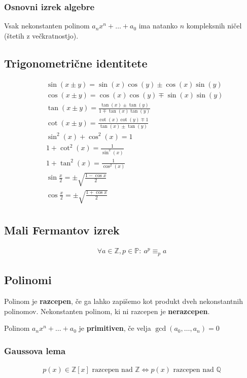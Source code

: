 	\subsubsection*{Osnovni izrek algebre}
	Vsak nekonstanten polinom $a_n x^n + \dots + a_0$ ima natanko $n$ kompleksnih ničel (štetih z večkratnostjo).

	\subsection*{Trigonometrične identitete}
	\begin{align*}
		&\sin(x \pm y) = \sin(x) \cos(y) \pm \cos(x) \sin(y) \\
		&\cos(x \pm y) = \cos(x) \cos(y) \mp \sin(x) \sin(y)\\
		&\tan(x \pm y) = \frac{\tan(x)\pm \tan(y)}{1 \mp \tan(x) \tan(y)}\\
		&\cot(x \pm y) = \frac{\cot(x)\cot(y) \mp 1}{\tan(x) \pm \tan(y)}\\
		&\sin^2(x)+\cos^2(x) = 1\\
		&1+\cot^2(x) = \frac{1}{\sin^2(x)}\\
		&1+\tan^2(x) = \frac{1}{\cos^2(x)}\\
		&\sin\frac{x}{2} = \pm\sqrt{\frac{1-\cos x}{2}}\\
		&\cos\frac{x}{2} = \pm\sqrt{\frac{1+\cos x}{2}}\\
	\end{align*}

	\subsection*{Mali Fermantov izrek}
	\begin{align*}
		\forall a \in \mathbb{Z}, p \in \mathbb{P}:\ a^p \equiv_p a
	\end{align*}

	\subsection*{Polinomi}
	Polinom je \textbf{razcepen}, če ga lahko zapišemo kot produkt dveh nekonstantnih polinomov.
	Nekonstanten polinom, ki ni razcepen je \textbf{nerazcepen}.

	Polinom $a_n x^n + \dots + a_0$ je \textbf{primitiven}, če velja $\gcd(a_0, \dots, a_n) = 0$

	\subsubsection*{Gaussova lema}
	\begin{align*}
		p(x) \in \mathbb{Z}[x] \text{ razcepen nad } \mathbb{Z} \iff p(x) \text{ razcepen nad } \mathbb{Q}
	\end{align*}

